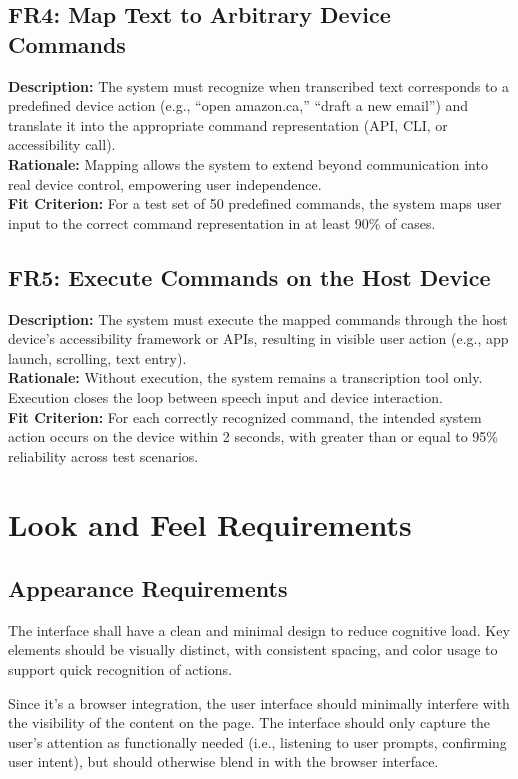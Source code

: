 \documentclass[12pt]{article}
\begin{document}
\bigskip
\subsection{FR4: Map Text to Arbitrary Device Commands}
\textbf{Description:} The system must recognize when transcribed text corresponds to a predefined device action (e.g., “open amazon.ca,” “draft a new email”) and translate it into the appropriate command representation (API, CLI, or accessibility call).\\
\textbf{Rationale:} Mapping allows the system to extend beyond communication into real device control, empowering user independence.\\
\textbf{Fit Criterion:} For a test set of 50 predefined commands, the system maps user input to the correct command representation in at least 90\% of cases.

\bigskip
\subsection{FR5: Execute Commands on the Host Device}
\textbf{Description:} The system must execute the mapped commands through the host device’s accessibility framework or APIs, resulting in visible user action (e.g., app launch, scrolling, text entry).\\
\textbf{Rationale:} Without execution, the system remains a transcription tool only. Execution closes the loop between speech input and device interaction.\\
\textbf{Fit Criterion:} For each correctly recognized command, the intended system action occurs on the device within 2 seconds, with greater than or equal to 95\% reliability across test scenarios.


\section{Look and Feel Requirements}
\subsection{Appearance Requirements}
The interface shall have a clean and minimal design to reduce cognitive load. Key elements should be visually distinct, with consistent spacing, and color usage to support quick recognition of actions.

Since it’s a browser integration, the user interface should minimally interfere with the visibility of the content on the page. The interface should only capture the user’s attention as functionally needed (i.e., listening to user prompts, confirming user intent), but should otherwise blend in with the browser interface.
\end{document}

